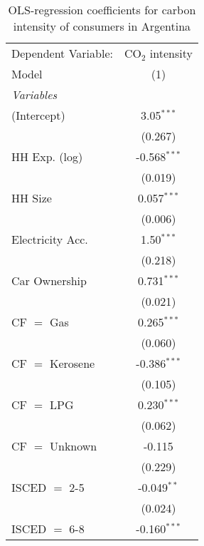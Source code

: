
\begin{table}[htbp!]
   \centering
   \small
   \begin{adjustbox}{width = 1\textwidth, max height = 0.95\textheight, center}
      \begin{threeparttable}[b]
         \caption{\label{tab:OLS_1_ARG} OLS-regression coefficients for carbon intensity of consumers in Argentina}
         \begin{tabular}{lc}
            \tabularnewline \midrule \midrule
            Dependent Variable: & CO$_{2}$ intensity\\  
            Model               & (1)\\  
            \midrule
            \emph{Variables}\\
            (Intercept)         & 3.05$^{***}$\\   
                                & (0.267)\\   
            HH Exp. (log)       & -0.568$^{***}$\\   
                                & (0.019)\\   
            HH Size             & 0.057$^{***}$\\   
                                & (0.006)\\   
            Electricity Acc.    & 1.50$^{***}$\\   
                                & (0.218)\\   
            Car Ownership       & 0.731$^{***}$\\   
                                & (0.021)\\   
            CF $=$ Gas          & 0.265$^{***}$\\   
                                & (0.060)\\   
            CF $=$ Kerosene     & -0.386$^{***}$\\   
                                & (0.105)\\   
            CF $=$ LPG          & 0.230$^{***}$\\   
                                & (0.062)\\   
            CF $=$ Unknown      & -0.115\\   
                                & (0.229)\\   
            ISCED $=$ 2-5       & -0.049$^{**}$\\   
                                & (0.024)\\   
            ISCED $=$ 6-8       & -0.160$^{***}$\\   

\end{tabular}
\end{threeparttable}
\end{adjustbox}
\end{table}
